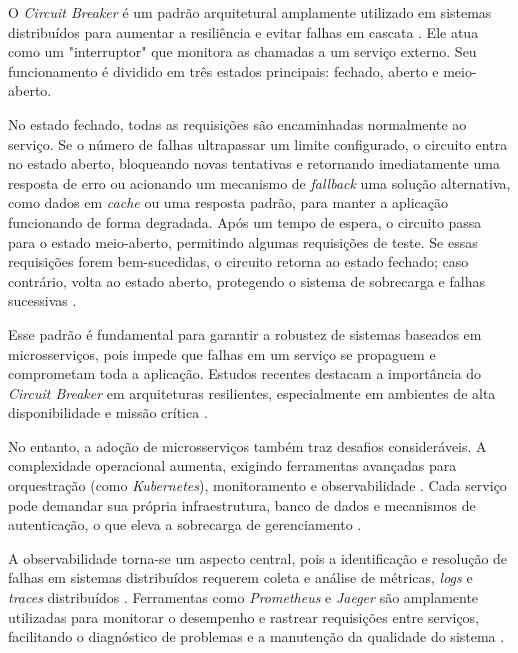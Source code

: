 O \textit{Circuit Breaker} é um padrão arquitetural amplamente utilizado em sistemas distribuídos para aumentar a resiliência e evitar falhas em cascata \cite{Nair2019CircuitBreaker, Fowler2012CircuitBreaker}. Ele atua como um "interruptor" que monitora as chamadas a um serviço externo. Seu funcionamento é dividido em três estados principais: fechado, aberto e meio-aberto.

No estado fechado, todas as requisições são encaminhadas normalmente ao serviço. Se o número de falhas ultrapassar um limite configurado, o circuito entra no estado aberto, bloqueando novas tentativas e retornando imediatamente uma resposta de erro ou acionando um mecanismo de \textit{fallback} uma solução alternativa, como dados em \textit{cache} ou uma resposta padrão, para manter a aplicação funcionando de forma degradada. Após um tempo de espera, o circuito passa para o estado meio-aberto, permitindo algumas requisições de teste. Se essas requisições forem bem-sucedidas, o circuito retorna ao estado fechado; caso contrário, volta ao estado aberto, protegendo o sistema de sobrecarga e falhas sucessivas \cite{Nair2019CircuitBreaker, Fowler2012CircuitBreaker}.

Esse padrão é fundamental para garantir a robustez de sistemas baseados em microsserviços, pois impede que falhas em um serviço se propaguem e comprometam toda a aplicação. Estudos recentes destacam a importância do \textit{Circuit Breaker} em arquiteturas resilientes, especialmente em ambientes de alta disponibilidade e missão crítica \cite{Nair2019CircuitBreaker}. 

No entanto, a adoção de microsserviços também traz desafios consideráveis. A complexidade operacional aumenta, exigindo ferramentas avançadas para orquestração (como \textit{Kubernetes}), monitoramento e observabilidade \cite{jamshidi2016systematic, shekhar2023microservices}. Cada serviço pode demandar sua própria infraestrutura, banco de dados e mecanismos de autenticação, o que eleva a sobrecarga de gerenciamento \cite{nizami2020comparison}.

A observabilidade torna-se um aspecto central, pois a identificação e resolução de falhas em sistemas distribuídos requerem coleta e análise de métricas, \textit{logs} e \textit{traces} distribuídos \cite{observability2023, sha2023automating}. Ferramentas como \textit{Prometheus} e \textit{Jaeger} são amplamente utilizadas para monitorar o desempenho e rastrear requisições entre serviços, facilitando o diagnóstico de problemas e a manutenção da qualidade do sistema \cite{ahmed2022observability}. 

